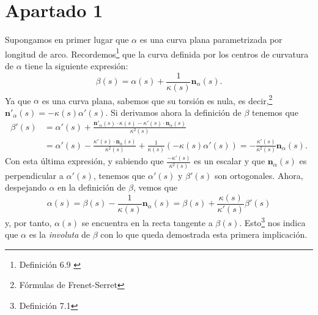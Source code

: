 \section{Apartado 1}
Supongamos en primer lugar que $\alpha$ es una curva plana parametrizada por
longitud de arco. Recordemos\footnote{Definición 6.9 \cite{sanjurjo}} que la
curva definida por los centros de curvatura de $\alpha$ tiene la siguiente
expresión:
\[
\beta\left( s \right) = \alpha\left( s \right) + \frac{1}{\kappa\left( s
\right)} \mathbf{n}_{\alpha}\left( s \right).
\]
Ya que $\alpha$ es una curva plana, sabemos que su torsión es nula, es
decir,\footnote{Fórmulas de Frenet-Serret} $\mathbf{n}'_{\alpha}\left( s \right)
= - \kappa\left( s \right)\alpha'\left( s \right)$. Si derivamos ahora la
definición de $\beta$ tenemos que
\begin{align*}
\beta'\left( s \right) &= \alpha'\left( s \right) +
\frac{\mathbf{n}'_{\alpha}\left( s \right) \cdot \kappa\left( s \right) -
\kappa'\left( s \right) \cdot \mathbf{n}_{\alpha}\left( s
\right)}{\kappa^2\left( s \right)} \\ &= \alpha'\left( s \right) -
\frac{\kappa'\left( s \right) \cdot \mathbf{n}_{\alpha}\left( s
\right)}{\kappa^2\left( s \right)} + \frac{1}{\kappa\left( s \right)} \left(
-\kappa\left( s \right) \alpha'\left( s \right) \right) =
\boxed{-\frac{\kappa'\left( s \right)}{\kappa^2\left( s \right)}
\mathbf{n}_{\alpha}\left( s \right)}.
\end{align*}
Con esta última expresión, y sabiendo que $\frac{-\kappa'\left( s
\right)}{\kappa^2\left( s \right)}$ es un escalar y que
$\mathbf{n}_{\alpha}\left( s \right)$ es perpendicular a $\alpha'\left( s \right)$, tenemos que
$\alpha'\left( s \right)$ y $\beta'\left( s \right)$ son ortogonales. Ahora,
despejando $\alpha$ en la definición de $\beta$, vemos que
\[
\alpha\left( s \right) = \beta\left( s \right) - \frac{1}{\kappa\left( s
\right)} \mathbf{n}_{\alpha}\left( s \right) = \beta\left( s \right) + \frac{\kappa\left(
s\right)}{\kappa'\left( s \right)} \beta'\left( s \right)
\]
y, por tanto, $\alpha\left( s \right)$ se encuentra en la recta tangente a
$\beta\left( s \right)$. Esto\footnote{Definición 7.1\cite{sanjurjo}} nos indica
que $\alpha$ es la \textit{involuta} de $\beta$ con lo que queda demostrada esta
primera implicación.


